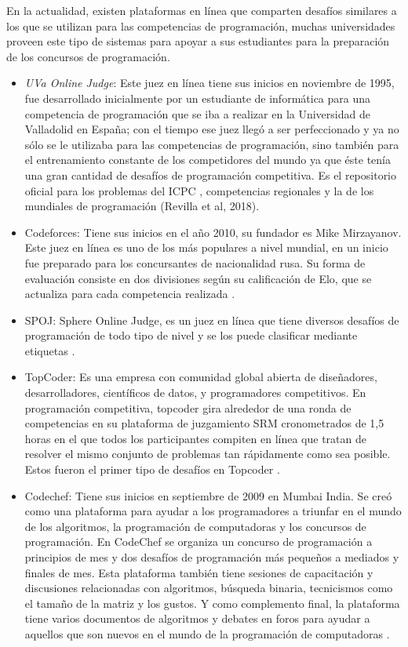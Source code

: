 En la actualidad, existen plataformas en línea que comparten desafíos similares a los que se utilizan para las competencias de programación, muchas universidades proveen este tipo de
sistemas para apoyar a sus estudiantes para la preparación de los concursos de programación.
\begin{itemize}
    \item \textit{UVa Online Judge}: Este juez en línea tiene sus inicios en noviembre de 1995, fue desarrollado inicialmente por un estudiante de informática para una competencia de programación que se iba a realizar en la Universidad de Valladolid en España; con el tiempo ese juez llegó a ser perfeccionado y ya no sólo se le utilizaba para las competencias de programación, sino también para el entrenamiento constante de los competidores del mundo ya que éste tenía una gran cantidad de desafíos de programación competitiva. Es el repositorio oficial para los problemas del ICPC , competencias regionales y la de los mundiales de programación (Revilla et al, 2018).
    \item Codeforces: Tiene sus inicios en el año 2010, su fundador es Mike Mirzayanov. Este juez en línea es uno de los más populares a nivel mundial, en un inicio fue preparado para los concursantes de nacionalidad rusa. Su forma de evaluación consiste en dos divisiones según su calificación de Elo, que se actualiza para cada competencia realizada \citep{codeforces}.
    \item SPOJ: Sphere Online Judge, es un juez en línea que tiene diversos desafíos de programación de todo tipo de nivel y se los puede clasificar mediante etiquetas \citep{spoj}.
    \item TopCoder: Es una empresa con comunidad global abierta de diseñadores, desarrolladores, científicos de datos, y programadores competitivos. En programación competitiva, topcoder gira alrededor de una ronda de competencias en su plataforma de juzgamiento SRM cronometrados de 1,5 horas en el que todos los participantes compiten en línea que tratan de resolver el mismo conjunto de problemas tan rápidamente como sea posible. Estos fueron el primer tipo de desafíos en Topcoder \citep{topcoder}.
    \item Codechef: Tiene sus inicios en septiembre de 2009 en Mumbai India. Se creó como una plataforma para ayudar a los programadores a triunfar en el mundo de los algoritmos, la programación de computadoras y los concursos de programación.
    En CodeChef se organiza un concurso de programación a principios de mes y dos desafíos de programación más pequeños a mediados y finales de mes. Esta plataforma también tiene sesiones de capacitación y discusiones relacionadas con algoritmos, búsqueda binaria, tecnicismos como el tamaño de la matriz y los gustos. Y como complemento final, la plataforma tiene varios documentos de algoritmos y debates en foros para ayudar a aquellos que son nuevos en el mundo de la programación de computadoras \citep{codechef}.
\end{itemize}

